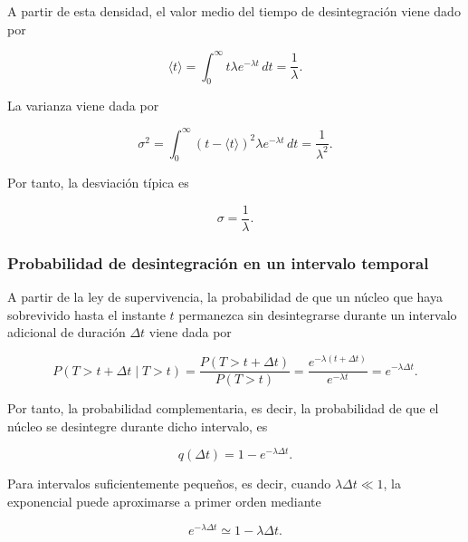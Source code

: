 \documentclass[12pt,a4paper]{article}
\begin{document}
A partir de esta densidad, el valor medio del tiempo de desintegración viene dado por

\begin{equation} 
  \langle t \rangle = \int_{0}^{\infty} t\lambda e^{-\lambda t}\,dt = \frac{1}{\lambda}. 
  \label{eq:valor_medio_exponencial} 
\end{equation}

La varianza viene dada por

\begin{equation}
    \sigma^2 = \int_{0}^{\infty} (t-\langle t\rangle)^2\lambda e^{-\lambda t}\,dt = \frac{1}{\lambda^2}.
\end{equation}

Por tanto, la desviación típica es

\begin{equation}
    \sigma=\frac{1}{\lambda}.
\end{equation}


\subsubsection{Probabilidad de desintegración en un intervalo temporal}

A partir de la ley de supervivencia, la probabilidad de que un núcleo que haya sobrevivido hasta el instante $t$ permanezca sin desintegrarse durante un intervalo adicional de duración $\Delta t$ viene dada por

\begin{equation}
    P(T>t+\Delta t \mid T>t)
    =
    \frac{P(T>t+\Delta t)}{P(T>t)}
    =
    \frac{e^{-\lambda(t+\Delta t)}}{e^{-\lambda t}}
    =
    e^{-\lambda \Delta t}.
\end{equation}

Por tanto, la probabilidad complementaria, es decir, la probabilidad de que el núcleo se desintegre durante dicho intervalo, es

\begin{equation}
    q(\Delta t)=1-e^{-\lambda \Delta t}.
    \label{eq:prob_desintegracion_intervalo}
\end{equation}

Para intervalos suficientemente pequeños, es decir, cuando $\lambda \Delta t \ll 1$, la exponencial puede aproximarse a primer orden mediante

\begin{equation}
    e^{-\lambda \Delta t}\simeq 1-\lambda \Delta t.
\end{equation}
\end{document}
